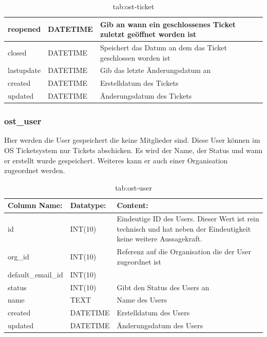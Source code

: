 \begin{table}[h]
\begin{tabular}{|p{3.5cm}|p{4cm}|p{7.2cm}|}
		\hline
		reopened & DATETIME & Gib an wann ein geschlossenes Ticket zuletzt geöffnet worden ist \\
		\hline
		closed & DATETIME & Speichert das Datum an dem das Ticket geschlossen worden ist \\
		\hline
		lastupdate & DATETIME & Gib das letzte Änderungsdatum an \\
		\hline
		created & DATETIME & Erstelldatum des Tickets\\
		\hline
		updated & DATETIME & Änderungsdatum des Tickets\\
		\hline
	\end{tabular}
	\caption{tab:ost-ticket}
\end{table}
\label{tab:ost_ticket}
\newpage

\subsubsection{ost\_user}

Hier werden die User gespeichert die keine Mitglieder sind. Diese User können im OS Ticketsystem nur Tickets abschicken. Es wird der Name, der Status und wann er erstellt wurde gespeichert. Weiteres kann er auch einer Organisation zugeordnet werden.

\begin{table}[h]
	\begin{tabular}{|p{3.5cm}|p{4cm}|p{7.2cm}|}
		\hline
		\textbf{Column Name:} & \textbf{Datatype:} & \textbf{Content:}\\
		\hline
		id & INT(10) & Eindeutige ID des Users. Dieser Wert ist rein technisch und hat  neben der Eindeutigkeit keine weitere 
		Aussagekraft.\\
		\hline
		org\_id & INT(10) & Referenz auf die Organisation die der User zugeordnet ist\\
		\hline
		default\_email\_id& INT(10) & \\
		\hline
		status & INT(10) & Gibt den Status des Users an\\
		\hline
		name & TEXT & Name des Users\\
		\hline
		created & DATETIME & Erstelldatum des Users\\
		\hline
		updated & DATETIME & Änderungsdatum des Users\\
		\hline
		
	\end{tabular}
	\caption{tab:ost-user}
\end{table}
\label{tab:ost_user}


